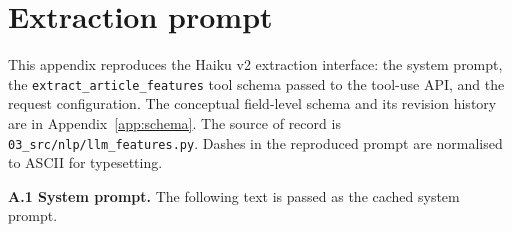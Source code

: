 \appendix

\chapter{Extraction prompt}\label{app:prompt}

This appendix reproduces the Haiku v2 extraction interface: the system prompt, the \texttt{extract\_article\_features} tool schema passed to the tool-use API, and the request configuration. The conceptual field-level schema and its revision history are in Appendix~\ref{app:schema}. The source of record is \texttt{03\_src/nlp/llm\_features.py}. Dashes in the reproduced prompt are normalised to ASCII for typesetting.

\textbf{A.1 System prompt.} The following text is passed as the cached system prompt.

